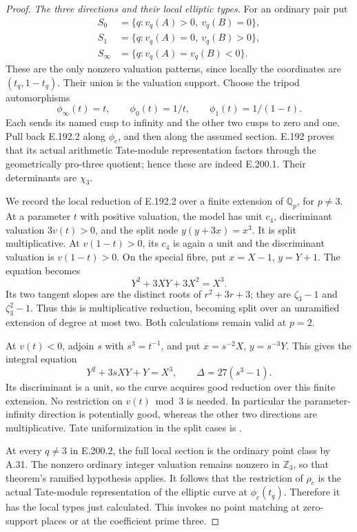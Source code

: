 \begin{proof}
\emph{The three directions and their local elliptic types.}
For an ordinary pair put
\[
\begin{aligned}
 S_0&=\{q:v_q(A)>0,\ v_q(B)=0\},\\
 S_1&=\{q:v_q(A)=0,\ v_q(B)>0\},\\
 S_\infty&=\{q:v_q(A)=v_q(B)<0\}.
\end{aligned}
\tag{E.200.2}
\]
These are the only nonzero valuation patterns, since locally the
coordinates are \((t_q,1-t_q)\).  Their union is the valuation support.
Choose the tripod automorphisms
\[
 \phi_\infty(t)=t,\qquad
 \phi_0(t)=1/t,\qquad
 \phi_1(t)=1/(1-t).
\tag{E.200.3}
\]
Each sends its named cusp to infinity and the other two cusps to
zero and one.  Pull back E.192.2 along \(\phi_c\), and then along
the assumed section.  E.192 proves that its actual arithmetic
Tate-module representation factors through the geometrically
pro-three quotient; hence these are indeed E.200.1.  Their
determinants are \(\chi_3\).

We record the local reduction of E.192.2 over a finite extension of
\(\mathbb Q_p\), for \(p\ne3\).  At a parameter \(t\) with positive
valuation, the model has unit \(c_4\), discriminant valuation
\(3v(t)>0\), and the split node \(y(y+3x)=x^3\).  It is split
multiplicative.  At \(v(1-t)>0\), its \(c_4\) is again a unit and
the discriminant valuation is \(v(1-t)>0\).  On the special fibre,
put \(x=X-1\), \(y=Y+1\).  The equation becomes
\[
                    Y^2+3XY+3X^2=X^3.
\tag{E.200.4}
\]
Its two tangent slopes are the distinct roots of
\(r^2+3r+3\); they are \(\zeta_3-1\) and
\(\zeta_3^2-1\).  Thus this is multiplicative reduction, becoming
split over an unramified extension of degree at most two.
Both calculations remain valid at \(p=2\).

At \(v(t)<0\), adjoin \(s\) with \(s^3=t^{-1}\), and put
\(x=s^{-2}X\), \(y=s^{-3}Y\).  This gives the integral equation
\[
                       Y^2+3sXY+Y=X^3,
       \qquad \Delta=27(s^3-1).
\tag{E.200.5}
\]
Its discriminant is a unit, so the curve acquires good reduction
over this finite extension.  No restriction on \(v(t)\bmod3\)
is needed.  In particular the parameter-infinity direction is
potentially good, whereas the other two directions are
multiplicative.  Tate uniformization in the split cases is
\citet[C.14, Theorem 14.1, pp.444--445]{AuditSilverman2009}.

At every \(q\ne3\) in E.200.2, the full local section is the
ordinary point class by A.31.  The nonzero ordinary integer
valuation remains nonzero in \(\mathbb Z_3\), so that theorem's
ramified hypothesis applies.  It follows that the restriction of
\(\rho_c\) is the actual Tate-module representation of the elliptic
curve at \(\phi_c(t_q)\).  Therefore it has the local types just
calculated.  This invokes no point matching at zero-support places
or at the coefficient prime three.


\end{proof}
